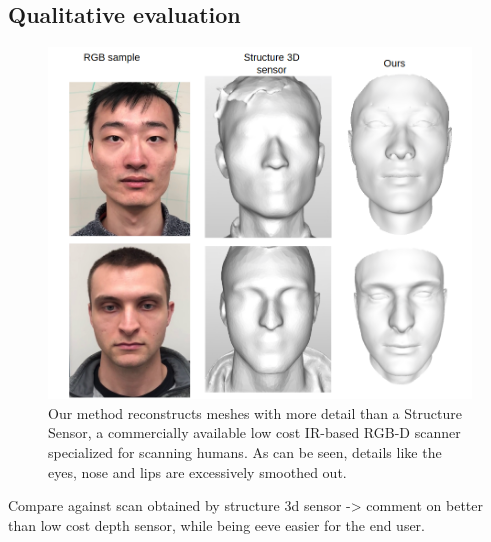 \documentclass[10pt,twocolumn,letterpaper]{article}
\begin{document}
\subsection{Qualitative evaluation} \label{sec:qual}
\begin{figure}[t]
\begin{center}
   \includegraphics[width=0.9\linewidth]{images/struc_3d_comp.png}
\end{center}
   \caption{Our method reconstructs meshes with more detail than a Structure Sensor, a commercially available low cost IR-based RGB-D scanner \cite{structure2019} specialized for scanning humans. As can be seen, details like the eyes, nose and lips are excessively smoothed out.}
\label{fig:long}
\label{fig:onecol}
\end{figure}

Compare against scan obtained by structure 3d sensor -> comment on better than low cost depth sensor, while being eeve easier for the end user.


\end{document}

